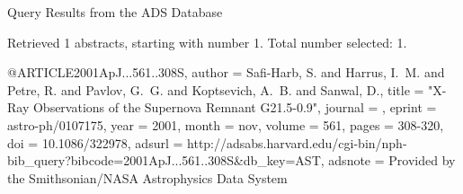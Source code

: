 Query Results from the ADS Database


Retrieved 1 abstracts, starting with number 1.  Total number selected: 1.

@ARTICLE{2001ApJ...561..308S,
   author = {{Safi-Harb}, S. and {Harrus}, I.~M. and {Petre}, R. and {Pavlov}, G.~G. and 
	{Koptsevich}, A.~B. and {Sanwal}, D.},
    title = "{X-Ray Observations of the Supernova Remnant G21.5-0.9}",
  journal = {\apj},
   eprint = {astro-ph/0107175},
     year = 2001,
    month = nov,
   volume = 561,
    pages = {308-320},
      doi = {10.1086/322978},
   adsurl = {http://adsabs.harvard.edu/cgi-bin/nph-bib_query?bibcode=2001ApJ...561..308S&db_key=AST},
  adsnote = {Provided by the Smithsonian/NASA Astrophysics Data System}
}


